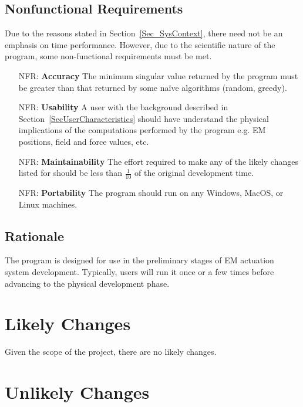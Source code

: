 \documentclass[12pt]{article}
\newcounter{nfrnum} %
\begin{document}
\subsection{Nonfunctional Requirements}
Due to the reasons stated in Section~\ref{Sec_SysContext}, there need not be an emphasis on time performance. However, due to the scientific nature of the program, some non-functional requirements must be met.  

\begin{itemize}

\item[NFR\refstepcounter{nfrnum}\thenfrnum \label{NFR_Accuracy}:]
  \textbf{Accuracy} The minimum singular value returned by the program must be greater than that returned by some naïve algorithms (random, greedy). 

\item[NFR\refstepcounter{nfrnum}\thenfrnum \label{NFR_Usability}:] \textbf{Usability}
    A user with the background described in Section~\ref{SecUserCharacteristics} should 
    have understand the physical implications of the computations performed by the program e.g. EM positions, field and force values, etc. 

\item[NFR\refstepcounter{nfrnum}\thenfrnum \label{NFR_Maintainability}:]
  \textbf{Maintainability} The effort required to make any of the likely
    changes listed for \progname{} should be less than $\frac{1}{10}$ of the original
    development time.

\item[NFR\refstepcounter{nfrnum}\thenfrnum \label{NFR_Portability}:]
  \textbf{Portability} The program should run on any Windows, MacOS, or Linux machines. 
\end{itemize}

\subsection{Rationale}
The program is designed for use in the preliminary stages of EM actuation system development. Typically, users will run it once or a few times before advancing to the physical development phase. 

\section{Likely Changes}    
\noindent
Given the scope of the project, there are no likely changes. 

\section{Unlikely Changes}    
\end{document}
